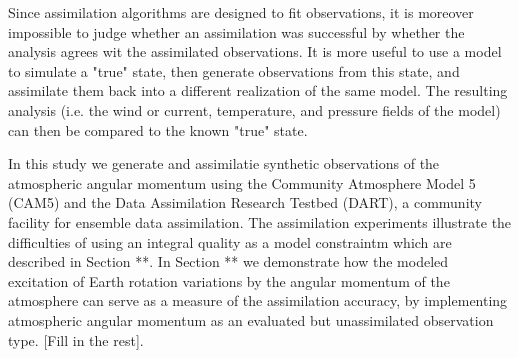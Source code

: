 Since assimilation algorithms are designed to fit observations, it is moreover impossible to judge whether an assimilation was successful by whether the analysis agrees wit the assimilated observations. 
It is more useful to use a model to simulate a "true" state, then generate observations from this state, and assimilate them back into a different realization of the same model. 
The resulting analysis (i.e. the wind or current, temperature, and pressure fields of the model) can then be compared to the known "true" state. 

In this study we generate and assimilatie synthetic observations of the atmospheric angular momentum using the Community Atmosphere Model 5 (CAM5) and the Data Assimilation Research Testbed (DART), a community facility for ensemble data assimilation.  
The assimilation experiments illustrate the difficulties of using an integral quality as a model constraintm which are described in Section **.
In Section ** we demonstrate how the modeled excitation of Earth rotation variations by the angular momentum of the atmosphere can serve as a measure of the assimilation accuracy, by implementing atmospheric angular momentum as an evaluated but unassimilated observation type. 
\textcolor{alert}{[Fill in the rest]}.

